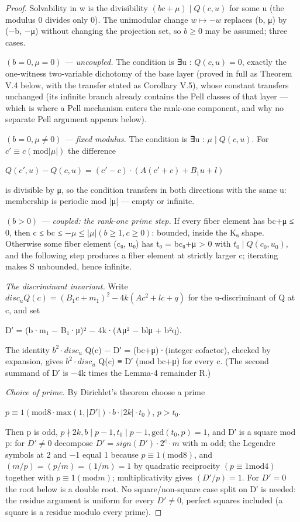 \documentclass[11pt]{article}
\theoremstyle{plain}
\theoremstyle{definition}
\theoremstyle{remark}
\theoremstyle{plain}
\theoremstyle{definition}
\theoremstyle{remark}
\theoremstyle{plain}
\theoremstyle{definition}
\theoremstyle{remark}
\begin{document}
\begin{proof}
Solvability in w is the divisibility $(bc+μ) ∣ Q(c,u)$ for some u (the modulus 0 divides only 0). The unimodular change $w ↦ −w$ replaces (b, μ) by (−b, −μ) without changing the projection set, so $b ≥ 0$ may be assumed; three cases.

\emph{$(b = 0, μ = 0)$ — uncoupled.} The condition is ∃u : $Q(c,u) = 0$, exactly the one-witness two-variable dichotomy of the base layer (proved in full as Theorem V.4 below, with the transfer stated as Corollary V.5), whose constant transfers unchanged (its infinite branch already contains the Pell classes of that layer — which is where a Pell mechanism enters the rank-one component, and why no separate Pell argument appears below).

\emph{$(b = 0, μ ≠ 0)$ — fixed modulus.} The condition is ∃u : $μ ∣ Q(c,u)$. For $c′ ≡ c (\mathrm{mod} |μ|)$ the difference

$Q(c′,u) − Q(c,u) = (c′−c)·(A(c′+c) + B_{1}u + l)$

is divisible by μ, so the condition transfers in both directions with the same u: membership is periodic mod |μ| — empty or infinite.

\emph{$(b > 0)$ — coupled: the rank-one prime step.} If every fiber element has bc+μ ≤ 0, then c ≤ bc ≤ $−μ ≤ |μ| (b ≥ 1, c ≥ 0)$: bounded, inside the K₆ shape. Otherwise some fiber element (c₀, u₀) has t₀ = bc₀+μ > 0 with $t_{0} ∣ Q(c_{0},u_{0})$, and the following step produces a fiber element at strictly larger c; iterating makes S unbounded, hence infinite.

\emph{The discriminant invariant.} Write $disc_{u} Q(c) = (B_{1}c+m_{1})^{2} − 4k(Ac^{2}+lc+q)$ for the u-discriminant of Q at c, and set

D′ = (b·m₁ − B₁·μ)² − 4k·(Aμ² − blμ + b²q).

The identity $b^{2}·disc_{u}$ Q(c) − D′ = (bc+μ)·(integer cofactor), checked by expansion, gives $b^{2}·disc_{u}$ Q(c) ≡ D′ (mod bc+μ) for every c. (The second summand of D′ is −4k times the Lemma-4 remainder R.)

\emph{Choice of prime.} By Dirichlet's theorem choose a prime

$p ≡ 1 (\mathrm{mod} 8·\mathrm{max}(1,|D′|)·b·|2k|·t_{0})$,   $p > t_{0}$.

Then p is odd, $p ∤ 2k, b ∣ p−1, t_{0} ∣ p−1, \mathrm{gcd}(t_{0}, p) = 1$, and D′ is a square mod p: for $D′ ≠ 0$ decompose $D′ = sign(D′)·2^{e}·m$ with m odd; the Legendre symbols at 2 and −1 equal 1 because $p ≡ 1 (\mathrm{mod} 8)$, and $(m/p) = (p/m) = (1/m) = 1$ by quadratic reciprocity $(p ≡ 1 \mathrm{mod} 4)$ together with $p ≡ 1 (\mathrm{mod} m)$; multiplicativity gives $(D′/p) = 1$. For $D′ = 0$ the root below is a double root. No square/non-square case split on D′ is needed: the residue argument is uniform for every $D′ ≠ 0$, perfect squares included (a square is a residue modulo every prime).


\end{proof}
\end{document}
